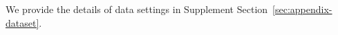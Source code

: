 \documentclass[sigconf]{acmart}
\begin{document}
We provide the details of data settings in {{Supplement Section~\ref{sec:appendix-dataset}}}.


\end{document}
